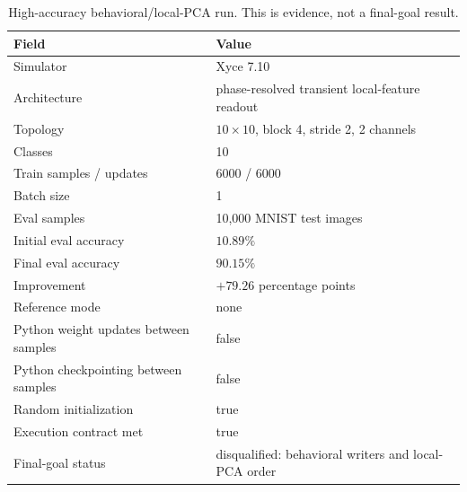 \documentclass[11pt]{article}
\begin{document}
\begin{table}[H]
  \centering
  \caption{High-accuracy behavioral/local-PCA run.  This is evidence, not a
  final-goal result.}
  \label{tab:headline}
  \begin{tabular}{ll}
    \toprule
    Field & Value \\
    \midrule
    Simulator & Xyce 7.10 \\
    Architecture & phase-resolved transient local-feature readout \\
    Topology & \(10\times10\), block 4, stride 2, 2 channels \\
    Classes & 10 \\
    Train samples / updates & 6000 / 6000 \\
    Batch size & 1 \\
    Eval samples & 10,000 MNIST test images \\
    Initial eval accuracy & \(10.89\%\) \\
    Final eval accuracy & \(\mathbf{90.15\%}\) \\
    Improvement & \(+79.26\) percentage points \\
    Reference mode & none \\
    Python weight updates between samples & false \\
    Python checkpointing between samples & false \\
    Random initialization & true \\
    Execution contract met & true \\
    Final-goal status & disqualified: behavioral writers and local-PCA order \\
    \bottomrule
  \end{tabular}
\end{table}
\end{document}
